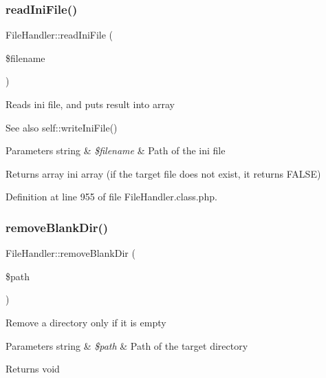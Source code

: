 \hypertarget{classFileHandler_a58a8bbae1ab4acb358599db38a47db4d}{}\label{classFileHandler_a58a8bbae1ab4acb358599db38a47db4d} 
\subsubsection{\texorpdfstring{read\+Ini\+File()}{readIniFile()}}
{\footnotesize\ttfamily File\+Handler\+::read\+Ini\+File (\begin{DoxyParamCaption}\item[{}]{\$filename }\end{DoxyParamCaption})}

Reads ini file, and puts result into array

\begin{DoxySeeAlso}{See also}
self\+::write\+Ini\+File() 
\end{DoxySeeAlso}

\begin{DoxyParams}[1]{Parameters}
string & {\em \$filename} & Path of the ini file \\
\hline
\end{DoxyParams}
\begin{DoxyReturn}{Returns}
array ini array (if the target file does not exist, it returns F\+A\+L\+SE) 
\end{DoxyReturn}


Definition at line 955 of file File\+Handler.\+class.\+php.

\hypertarget{classFileHandler_a538bfd50008250786985c7da4ff768f1}{}\label{classFileHandler_a538bfd50008250786985c7da4ff768f1} 
\subsubsection{\texorpdfstring{remove\+Blank\+Dir()}{removeBlankDir()}}
{\footnotesize\ttfamily File\+Handler\+::remove\+Blank\+Dir (\begin{DoxyParamCaption}\item[{}]{\$path }\end{DoxyParamCaption})}

Remove a directory only if it is empty


\begin{DoxyParams}[1]{Parameters}
string & {\em \$path} & Path of the target directory \\
\hline
\end{DoxyParams}
\begin{DoxyReturn}{Returns}
void 
\end{DoxyReturn}


